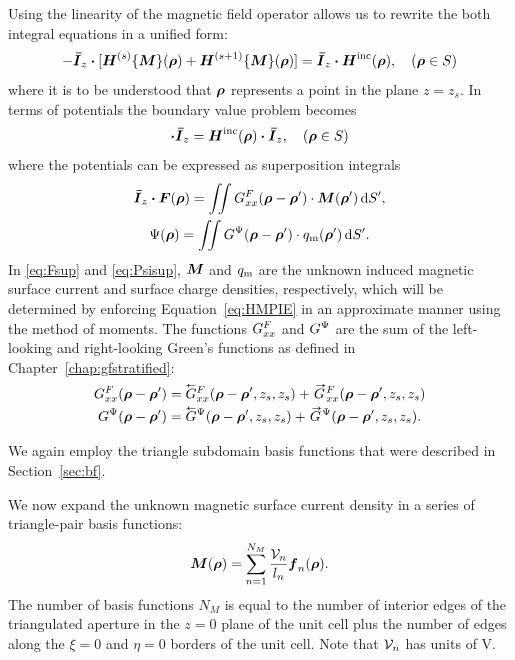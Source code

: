 Using the linearity of the magnetic field operator allows
us to rewrite the both integral equations in a unified form:
\begin{equation}
-\boldsymbol{\bar{I}}_z \boldsymbol{\cdot} [\boldsymbol{H}^{(s)}\{\boldsymbol{M}\}(\boldsymbol{\rho}) + 
\boldsymbol{H}^{(s+1)}\{\boldsymbol{M}\}(\boldsymbol{\rho})] = 
\boldsymbol{\bar{I}}_z \boldsymbol{\cdot} \boldsymbol{H}^{\text{inc}}(\boldsymbol{\rho}), \quad (\boldsymbol{\rho} \in S)
  \label{eq:MFIE}
\end{equation}
where it is to be understood that $\boldsymbol{\rho}$ represents a point in the
plane $z=z_s.$
In terms of potentials the boundary value problem becomes
\begin{equation}
  [-j\omega \F(\vecrho) + \gradient\Psi(\vecrho)] \bdot \Idemfactor_z = 
  \H\inc(\vecrho) \bdot \Idemfactor_z, \quad (\vecrho \in S)
  \label{eq:HMPIE}
\end{equation}
where the potentials can be expressed as superposition integrals
 \begin{gather}
   \boldsymbol{\bar{I}}_z \boldsymbol{\cdot} \boldsymbol{F}(\boldsymbol{\rho}) = 
   \iint G^F_{xx}(\boldsymbol{\rho}-\boldsymbol{\rho}') \cdot \boldsymbol{M}(\boldsymbol{\rho}') \, \text{d} S',
   \label{eq:Fsup}\\
   \Psi(\boldsymbol{\rho}) = \iint {G}^{\Psi}(\boldsymbol{\rho}-\boldsymbol{\rho}') \cdot q_{\text{m}}(\boldsymbol{\rho}') \, \text{d} S'.
   \label{eq:Psisup}
 \end{gather}
In \eqref{eq:Fsup} and \eqref{eq:Psisup}, $\boldsymbol{M}$ and $q_{\text{m}}$ are the unknown
induced magnetic surface current and surface charge densities,
respectively, which will be determined
by enforcing
Equation~\eqref{eq:HMPIE} in an approximate manner using the method of
moments. The functions $G^F_{xx}$ and ${G}^{\Psi}$ are the sum of the
left-looking and right-looking Green's functions as defined in 
Chapter~\ref{chap:gfstratified}:
\begin{subequations}
  \begin{align}
    \GFxx(\vecrho-\vecrho') &=
    \GlFxx(\vecrho-\vecrho',z_s,z_s) +
    \GrFxx(\vecrho-\vecrho',z_s,z_s) \\
    \GPsi(\vecrho-\vecrho') &=
    \GlPsi(\vecrho-\vecrho',z_s,z_s) +
    \GrPsi(\vecrho-\vecrho',z_s,z_s).
  \end{align}
  \label{eq:GFxxGpsileftright}
\end{subequations}


 We again employ the triangle subdomain basis functions that
were described in Section~\ref{sec:bf}.

We now expand the unknown magnetic surface current density 
in a series of triangle-pair basis functions:
\begin{equation}
  \label{eq:Mexpand}
  \boldsymbol{M}(\boldsymbol{\rho}) =  \sum_{n=1}^{N_M} \frac{\mathcal{V}_n}{l_n} \boldsymbol{f}_n(\boldsymbol{\rho}).
\end{equation}
The number of basis functions
$N_M$ is equal to the number of interior edges of the triangulated aperture in the
$z=0$ plane of the unit cell plus the number of edges along the $\xi=0$ and $\eta=0$
borders of the unit cell.  Note that $\mathcal{V}_n$ has units of \si{V}.


